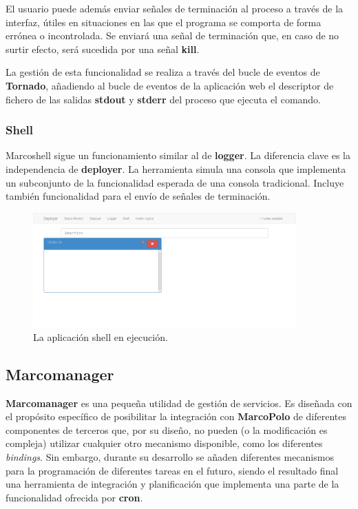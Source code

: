 El usuario puede además enviar señales de terminación al proceso a través de la interfaz, útiles en situaciones en las que el programa se comporta de forma errónea o incontrolada. Se enviará una señal de terminación que, en caso de no surtir efecto, será sucedida por una señal \textbf{kill}. 

La gestión de esta funcionalidad se realiza a través del bucle de eventos de \textbf{Tornado}, añadiendo al bucle de eventos de la aplicación web el descriptor de fichero de las salidas \textbf{stdout} y \textbf{stderr} del proceso que ejecuta el comando.

\subsubsection{Shell}

Marcoshell sigue un funcionamiento similar al de \textbf{logger}. La diferencia clave es la independencia de \textbf{deployer}. La herramienta simula una consola que implementa un subconjunto de la funcionalidad esperada de una consola tradicional. Incluye también funcionalidad para el envío de señales de terminación.

\begin{figure}[H]
\centering
\includegraphics[width=0.9\textwidth]{Chapters/Chapter5/Figures/logger-shell}
\caption[La aplicación shell en ejecución]{La aplicación shell en ejecución.}
\end{figure}

\subsection{Marcomanager}
\label{marcomanager}

\textbf{Marcomanager} es una pequeña utilidad de gestión de servicios. Es diseñada con el propósito específico de posibilitar la integración con \textbf{MarcoPolo} de diferentes componentes de terceros que, por su diseño, no pueden (o la modificación es compleja) utilizar cualquier otro mecanismo disponible, como los diferentes \textit{bindings}. Sin embargo, durante su desarrollo se añaden diferentes mecanismos para la programación de diferentes tareas en el futuro, siendo el resultado final una herramienta de integración y planificación que implementa una parte de la funcionalidad ofrecida por \textbf{cron}.


